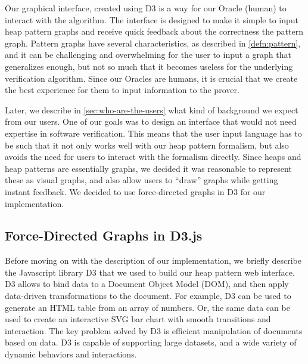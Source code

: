 Our graphical interface, created using D3 \cite{d3js} is a way for our Oracle (human) to
interact with the \verifier algorithm. The interface is designed to make it simple to
input heap pattern graphs and receive quick feedback about the correctness the pattern
graph. Pattern graphs have several characteristics, as described in
\autoref{defn:pattern}, and it can be challenging and overwhelming for the user to input
a graph that generalizes enough, but not so much that it becomes useless for the
underlying verification algorithm. Since our Oracles are humans, it is crucial that we
create the best experience for them to input information to the prover.

Later, we describe in \autoref{sec:who-are-the-users} what kind of background we expect
from our users. One of our goals was to design an interface that would not need
expertise in software verification. This means that the user input language has to be
such that it not only works well with our heap pattern formalism, but also avoids the
need for users to interact with the formalism directly. Since heaps and heap patterns
are essentially graphs, we decided it was reasonable to represent these as visual
graphs, and also allow users to ``draw'' graphs while getting instant feedback. We
decided to use force-directed graphs in D3 for our implementation.

\subsection{Force-Directed Graphs in D3.js}
Before moving on with the description of our implementation, we briefly describe the
Javascript library D3 that we used to build our heap pattern web interface. D3 allows to
bind data to a Document Object Model (DOM), and then apply data-driven transformations
to the document. For example, D3 can be used to generate an HTML table from an array of
numbers. Or, the same data can be used to create an interactive SVG bar chart with
smooth transitions and interaction. The key problem solved by D3 is efficient
manipulation of documents based on data. D3 is capable of supporting large datasets, and
a wide variety of dynamic behaviors and interactions.

